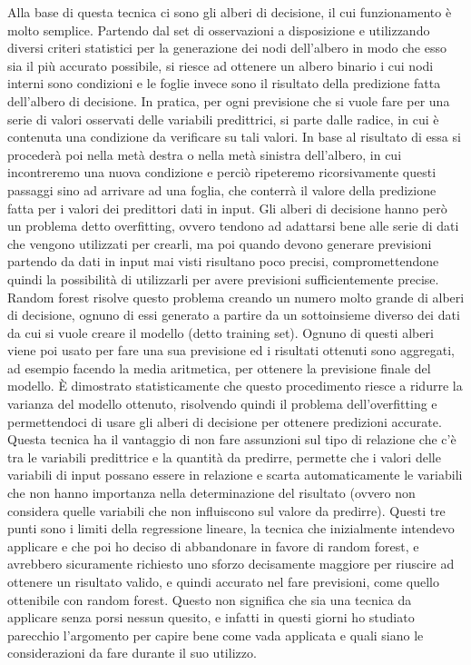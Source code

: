 \documentclass{article}
\begin{document}
Alla base di questa tecnica ci sono gli alberi di decisione, il cui funzionamento è molto semplice. Partendo dal set di osservazioni a disposizione e utilizzando diversi criteri statistici per la generazione dei nodi dell'albero in modo che esso sia il più accurato possibile, si riesce ad ottenere un albero binario i cui nodi interni sono condizioni e le foglie invece sono il risultato della predizione fatta dell'albero di decisione. In pratica, per ogni previsione che si vuole fare per una serie di valori osservati delle variabili predittrici, si parte dalle radice, in cui è contenuta una condizione da verificare su tali valori. In base al risultato di essa si procederà poi nella metà destra o nella metà sinistra dell'albero, in cui incontreremo una nuova condizione e perciò ripeteremo ricorsivamente questi passaggi sino ad arrivare ad una foglia, che conterrà il valore della predizione fatta per i valori dei predittori dati in input.
Gli alberi di decisione hanno però un problema detto overfitting, ovvero tendono ad adattarsi bene alle serie di dati che vengono utilizzati per crearli, ma poi quando devono generare previsioni partendo da dati in input mai visti risultano poco precisi, compromettendone quindi la possibilità di utilizzarli per avere previsioni sufficientemente precise. Random forest risolve questo problema creando un numero molto grande di alberi di decisione, ognuno di essi generato a partire da un sottoinsieme diverso dei dati da cui si vuole creare il modello (detto training set). Ognuno di questi alberi viene poi usato per fare una sua previsione ed i risultati ottenuti sono aggregati, ad esempio facendo la media aritmetica, per ottenere la previsione finale del modello. È dimostrato statisticamente che questo procedimento riesce a ridurre la varianza del modello ottenuto, risolvendo quindi il problema dell'overfitting e permettendoci di usare gli alberi di decisione per ottenere predizioni accurate.
Questa tecnica ha il vantaggio di non fare assunzioni sul tipo di relazione che c'è tra le variabili predittrice e la quantità da predirre, permette che i valori delle variabili di input possano essere in relazione e scarta automaticamente le variabili che non hanno importanza nella determinazione del risultato (ovvero non considera quelle variabili che non influiscono sul valore da predirre). Questi tre punti sono i limiti della regressione lineare, la tecnica che inizialmente intendevo applicare e che poi ho deciso di abbandonare in favore di random forest, e avrebbero sicuramente richiesto uno sforzo decisamente maggiore per riuscire ad ottenere un risultato valido, e quindi accurato nel fare previsioni, come quello ottenibile con random forest. Questo non significa che sia una tecnica da applicare senza porsi nessun quesito, e infatti in questi giorni ho studiato parecchio l'argomento per capire bene come vada applicata e quali siano le considerazioni da fare durante il suo utilizzo.
\end{document}
